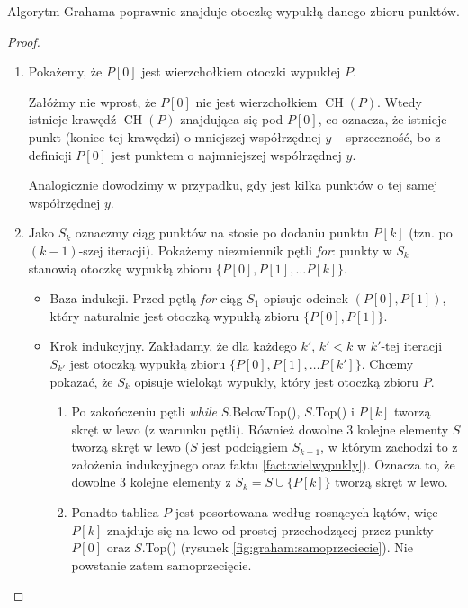 \begin{theorem}
	Algorytm Grahama poprawnie znajduje otoczkę wypukłą danego zbioru punktów.
	\begin{proof}
		\phantom{a}
		\begin{enumerate}
			\item Pokażemy, że $P[0]$ jest wierzchołkiem otoczki wypukłej $P$. 
			
			Załóżmy nie wprost, że $P[0]$ nie jest wierzchołkiem $\operatorname{CH}(P)$. Wtedy istnieje krawędź $\operatorname{CH}(P)$ znajdująca się pod $P[0]$, co oznacza, że istnieje punkt (koniec tej krawędzi) o mniejszej współrzędnej $y$ -- sprzeczność, bo z definicji $P[0]$ jest punktem o najmniejszej współrzędnej $y$.
			
			Analogicznie dowodzimy w przypadku, gdy jest kilka punktów o tej samej współrzędnej $y$.
			
			\item Jako $S_k$ oznaczmy ciąg punktów na stosie po dodaniu punktu $P[k]$ (tzn. po $(k-1)$-szej iteracji). Pokażemy niezmiennik pętli \textit{for}: punkty w $S_{k}$ stanowią otoczkę wypukłą zbioru $\{P[0], P[1], \dots P[k]\}$.
			
			\begin{itemize}
				\item Baza indukcji. Przed pętlą \textit{for} ciąg $S_1$ opisuje odcinek $(P[0], P[1])$, który naturalnie jest otoczką wypukłą zbioru  $\{P[0], P[1]\}$.
				
				\item Krok indukcyjny. Zakładamy, że dla każdego $k'$, $k'<k$ w $k'$-tej iteracji $S_{k'}$ jest otoczką wypukłą zbioru $\{P[0], P[1], \dots P[k']\}$. 
				Chcemy pokazać, że $S_k$ opisuje wielokąt wypukły, który jest otoczką zbioru $P$.
				
				\begin{enumerate}				
					\item Po zakończeniu pętli \textit{while} $S$.BelowTop(), $S$.Top() i $P[k]$ tworzą skręt w lewo (z warunku pętli). Również dowolne 3 kolejne elementy $S$ tworzą skręt w lewo ($S$ jest podciągiem $S_{k-1}$, w którym zachodzi to z założenia indukcyjnego oraz faktu \ref{fact:wielwypukly}). Oznacza to, że dowolne 3 kolejne elementy z $S_k = S \cup \{P[k]\}$ tworzą skręt w lewo. 
					
					\item Ponadto tablica $P$ jest posortowana według rosnących kątów, więc $P[k]$ znajduje się na lewo od prostej przechodzącej przez punkty $P[0]$ oraz $S$.Top() (rysunek \ref{fig:graham:samoprzeciecie}). Nie powstanie zatem samoprzecięcie.
					

\end{enumerate}
\end{itemize}
\end{enumerate}
\end{proof}
\end{theorem}
